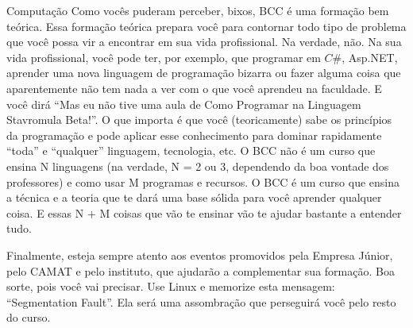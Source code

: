 \begin{subsecao}{Computação}
Como vocês puderam perceber, bixos, BCC é uma formação bem teórica. Essa
formação teórica prepara você para contornar todo tipo de problema que você
possa vir a encontrar em sua vida profissional. Na verdade, não. Na sua vida
profissional, você pode ter, por exemplo, que programar em $C\#$, Asp.NET,
aprender uma nova linguagem de programação bizarra ou fazer alguma coisa que
aparentemente não tem nada a ver com o que você aprendeu na faculdade. E você
dirá ``Mas eu não tive uma aula de Como Programar na Linguagem Stavromula
Beta!''. O que importa é que você (teoricamente) sabe os princípios da
programação e pode aplicar esse conhecimento para dominar rapidamente ``toda'' e
``qualquer'' linguagem, tecnologia, etc. O BCC não é um curso que ensina N
linguagens (na verdade, N = 2 ou 3, dependendo da boa vontade dos professores) e
como usar M programas e recursos. O BCC é um curso que ensina a técnica e a
teoria que te dará uma base sólida para você aprender qualquer coisa. E essas N
+ M coisas que vão te ensinar vão te ajudar bastante a entender tudo.

Finalmente, esteja sempre atento aos eventos promovidos pela Empresa Júnior,
pelo CAMAT e pelo instituto, que ajudarão a complementar sua formação. Boa
sorte, pois você vai precisar. Use Linux e memorize esta
mensagem: ``Segmentation Fault''. Ela será uma assombração que perseguirá você
pelo resto do curso.

\end{subsecao}
